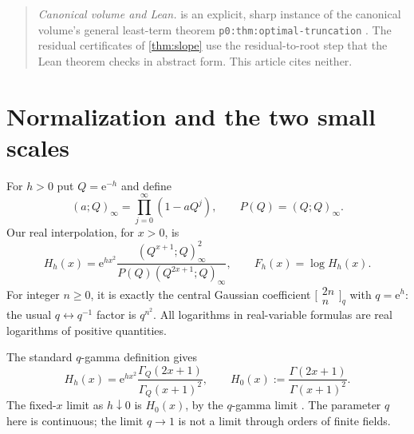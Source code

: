 \documentclass[11pt,a4paper]{article}
\theoremstyle{definition}
\theoremstyle{remark}
\newcommand{\e}{\mathrm e}
\begin{document}
\begin{quote}
\emph{Canonical volume and Lean.}  is an explicit, sharp
instance of the canonical volume's general least-term theorem
\texttt{p0:thm:optimal-truncation} \cite{ed:tai}. The residual certificates
of \cref{thm:slope} use the residual-to-root step that the Lean theorem
 \cite{ed:lean} checks in
abstract form. This article cites neither.
\end{quote}

\section{Normalization and the two small scales}
\label{sec:normalization}
For $h>0$ put $Q=\e^{-h}$ and define
\begin{equation}
 (a;Q)_\infty=\prod_{j=0}^{\infty}(1-aQ^j),\qquad
 P(Q)=(Q;Q)_\infty.
 \label{eq:poch}
\end{equation}
Our real interpolation, for $x>0$, is
\begin{equation}
 H_h(x)=\e^{hx^2}
 \frac{(Q^{x+1};Q)_\infty^2}
 {P(Q)(Q^{2x+1};Q)_\infty},\qquad F_h(x)=\log H_h(x).
 \label{eq:H}
\end{equation}
For integer $n\ge0$, it is exactly the central Gaussian coefficient
$\bigl[\begin{smallmatrix}2n\\n\end{smallmatrix}\bigr]_{q}$ with $q=\e^h$:
the usual $q\leftrightarrow q^{-1}$ factor is $q^{n^2}$. All logarithms in
real-variable formulas are real logarithms of positive quantities.

The standard $q$-gamma definition gives
\begin{equation}
 H_h(x)=\e^{hx^2}\frac{\Gamma_Q(2x+1)}{\Gamma_Q(x+1)^2},
 \qquad
 H_0(x):=\frac{\Gamma(2x+1)}{\Gamma(x+1)^2}.
 \label{eq:qgamma}
\end{equation}
The fixed-$x$ limit as $h\downarrow0$ is $H_0(x)$, by the $q$-gamma limit
\cite{dlmfqgamma}. The parameter $q$ here is continuous; the limit $q\to1$
is not a limit through orders of finite fields.
\end{document}
